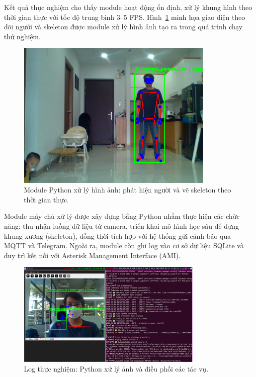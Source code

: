Kết quả thực nghiệm cho thấy module hoạt động ổn định, xử lý khung hình theo thời gian thực với tốc độ trung bình 3--5 FPS.  
Hình~\ref{fig:python_skeleton} minh họa giao diện theo dõi người và skeleton được module xử lý hình ảnh tạo ra trong quá trình chạy thử nghiệm.

\begin{figure}[H]
    \centering
    \includegraphics[width=0.85\textwidth]{figures/fall_detection_screen_shoot.png}
    \caption{Module Python xử lý hình ảnh: phát hiện người và vẽ skeleton theo thời gian thực.}
    \label{fig:python_skeleton}
\end{figure}


Module máy chủ xử lý được xây dựng bằng Python nhằm thực hiện các chức năng: thu nhận luồng dữ liệu từ camera, triển khai mô hình học sâu để dựng khung xương (skeleton), đồng thời tích hợp với hệ thống gửi cảnh báo qua MQTT và Telegram. Ngoài ra, module còn ghi log vào cơ sở dữ liệu SQLite và duy trì kết nối với Asterisk Management Interface (AMI).  

\begin{figure}[H]
    \centering
    \includegraphics[width=0.8\textwidth]{figures/python_runing_log.png}
    \caption{Log thực nghiệm: Python xử lý ảnh và điều phối các tác vụ.}
    \label{fig:python_runing_log}
\end{figure}

